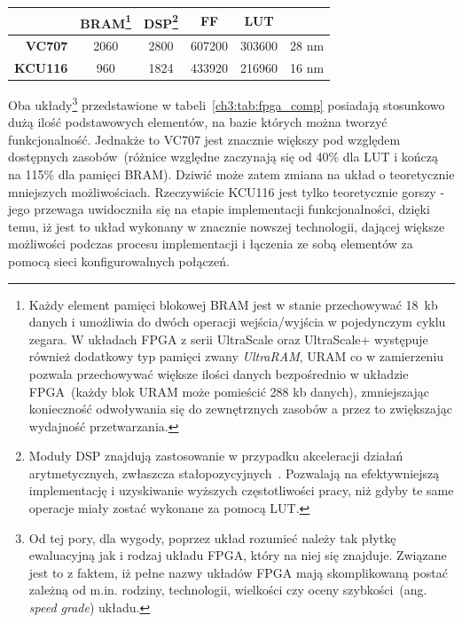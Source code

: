 \begin{enumerate}
\begin{savenotes}
\begin{table}[H]
\begin{tabular}{|r|c|c|c|c|c|}
                  & BRAM\footnote{Każdy element pamięci blokowej BRAM jest w stanie przechowywać 18~kb danych i umożliwia do dwóch operacji wejścia/wyjścia w pojedynczym cyklu zegara. W układach FPGA z serii UltraScale oraz UltraScale+ występuje również dodatkowy typ pamięci zwany \textit{UltraRAM}, URAM co w zamierzeniu pozwala przechowywać większe ilości danych bezpośrednio w układzie FPGA~(każdy blok URAM może pomieścić 288 kb danych), zmniejszając konieczność odwoływania się do zewnętrznych zasobów a przez to zwiększając wydajność przetwarzania. }      & DSP\footnote{Moduły DSP znajdują zastosowanie w przypadku akceleracji działań arytmetycznych, zwłaszcza stałopozycyjnych~\cite{DSP48E1}\cite{DSP48E2}. Pozwalają na efektywniejszą implementację i uzyskiwanie wyższych częstotliwości pracy, niż gdyby te same operacje miały zostać wykonane za pomocą LUT.}       & FF         & LUT        &                                                                                 \\ \hline
\textbf{VC707}    & 2060      & 2800      & 607200     & 303600     & 28 nm                                                                   \\ \hline
\textbf{KCU116}   & 960       & 1824      & 433920     & 216960     & 16 nm                                                                \\ \hline
\end{tabular}
\end{table}
\end{savenotes}
Oba układy\footnote{Od tej pory, dla wygody, poprzez układ rozumieć należy tak płytkę ewaluacyjną jak i rodzaj układu FPGA, który na niej się znajduje. Związane jest to z faktem, iż pełne nazwy układów FPGA mają skomplikowaną postać zależną od m.in. rodziny, technologii, wielkości czy oceny szybkości~(ang. \textit{speed grade}) układu.} przedstawione w tabeli~\ref{ch3:tab:fpga_comp} posiadają stosunkowo dużą ilość podstawowych elementów, na bazie których można tworzyć funkcjonalność. Jednakże to VC707 jest znacznie większy pod względem dostępnych zasobów~(różnice względne zaczynają się od 40\% dla LUT i kończą na 115\% dla pamięci BRAM). Dziwić może zatem zmiana na układ o teoretycznie mniejszych możliwościach. Rzeczywiście KCU116 jest tylko teoretycznie gorszy - jego przewaga uwidoczniła się na etapie implementacji funkcjonalności, dzięki temu, iż jest to układ wykonany w znacznie nowszej technologii, dającej większe możliwości podczas procesu implementacji i łączenia ze sobą elementów za pomocą sieci konfigurowalnych połączeń.

\end{enumerate}
